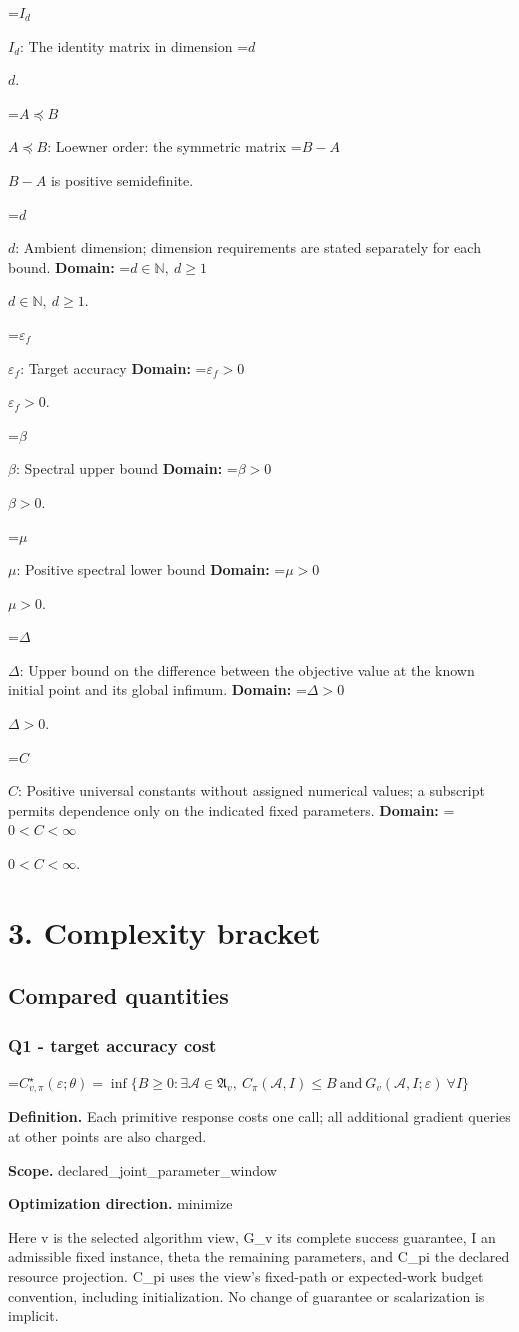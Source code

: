 \documentclass[10pt,a4paper]{article}
\newcommand{\AtlasMath}[1]{\par\begingroup\centering\setbox0=\hbox{$\displaystyle #1$}\ifdim\wd0>1.4\linewidth\typeout{ATLAS WIDE FORMULA: \the\wd0}\fi\ifdim\wd0>\linewidth\resizebox{\linewidth}{!}{\box0}\else\box0\fi\par\endgroup}
\newcommand{\AtlasInlineMath}[1]{\begingroup\setbox0=\hbox{$#1$}\ifdim\wd0>.4\linewidth\endgroup\AtlasMath{#1}\else\endgroup$#1$\fi}
\begin{document}
\AtlasInlineMath{I_d}: The identity matrix in dimension \AtlasInlineMath{d}.

\AtlasInlineMath{A\preceq B}: Loewner order: the symmetric matrix \AtlasInlineMath{B-A} is positive semidefinite.

\AtlasInlineMath{d}: Ambient dimension; dimension requirements are stated separately for each bound. \textbf{Domain:} \AtlasInlineMath{d\in\mathbb{N},\ d\ge1}.

\AtlasInlineMath{\varepsilon_f}: Target accuracy \textbf{Domain:} \AtlasInlineMath{\varepsilon_f>0}.

\AtlasInlineMath{\beta}: Spectral upper bound \textbf{Domain:} \AtlasInlineMath{\beta>0}.

\AtlasInlineMath{\mu}: Positive spectral lower bound \textbf{Domain:} \AtlasInlineMath{\mu>0}.

\AtlasInlineMath{\Delta}: Upper bound on the difference between the objective value at the known initial point and its global infimum. \textbf{Domain:} \AtlasInlineMath{\Delta>0}.

\AtlasInlineMath{C}: Positive universal constants without assigned numerical values; a subscript permits dependence only on the indicated fixed parameters. \textbf{Domain:} \AtlasInlineMath{0<C<\infty}.

\section{3. Complexity bracket}
\subsection{Compared quantities}
\subsubsection{Q1 - target accuracy cost}
\AtlasMath{C^\star_{v,\pi}(\varepsilon;\theta)=\inf\{B\ge0:\exists\mathcal A\in\mathfrak A_v,\ C_\pi(\mathcal A,I)\le B\ \text{and}\ G_v(\mathcal A,I;\varepsilon)\ \forall I\}}
\textbf{Definition.} Each primitive response costs one call; all additional gradient queries at other points are also charged.

\textbf{Scope.} declared\_\allowbreak{}joint\_\allowbreak{}parameter\_\allowbreak{}window

\textbf{Optimization direction.} minimize

Here v is the selected algorithm view, G\_\allowbreak{}v its complete success guarantee, I an admissible fixed instance, theta the remaining parameters, and C\_\allowbreak{}pi the declared resource projection. C\_\allowbreak{}pi uses the view's fixed-path or expected-work budget convention, including initialization. No change of guarantee or scalarization is implicit.
\end{document}
